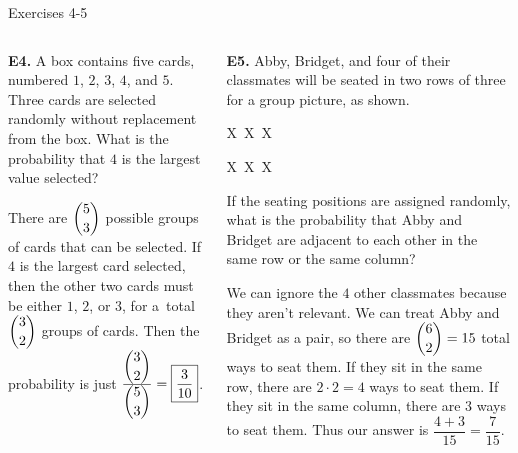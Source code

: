 \documentclass[9pt,aspectratio=169]{beamer}
\begin{document}
\begin{frame}{Exercises 4-5}
  \begin{columns}[T]
    \begin{column}{0.5\textwidth}
      \begin{problem}
        \textbf{E4.} A box contains five cards, numbered $1$, $2$, $3$, $4$, and $5$. Three cards are selected randomly without replacement from the box. What is the probability that $4$ is the largest value selected?
      \end{problem}\pause
      There are $\dbinom{5}{3}$ possible groups of cards that can be selected. If $4$ is the largest card selected, then the other two cards must be either $1$, $2$, or $3$, for a~total $\dbinom{3}{2}$ groups of cards. Then the probability is just ${\frac{{\dbinom{3}{2}}}{{\dbinom{5}{3}}}} = \boxed{\frac{3}{10}}$.\pause
    \end{column}
    \begin{column}{0.5\textwidth}
      \begin{problem}
        \textbf{E5.} Abby, Bridget, and four of their classmates will be seated in two rows of three for a group picture, as shown.
        \begin{center}
          \vspace*{-\baselineskip}
          \quad X\ X\ X
  
          \quad X\ X\ X  
        \end{center}
        If the seating positions are assigned randomly, what is the probability that Abby and Bridget are adjacent to each other in the same row or the same column?
      \end{problem}\pause
      We can ignore the $4$ other classmates because they aren't relevant. We can treat Abby and Bridget as a pair, so there are $\dbinom{6}{2}=15$ total ways to seat them. If they sit in the same row, there are $2\cdot2=4$ ways to seat them. If they sit in the same column, there are $3$ ways to seat them. Thus our answer is $\dfrac{4+3}{15} = \boxed{\dfrac{7}{15}}$.
    \end{column}
  \end{columns}
\end{frame}
\end{document}
